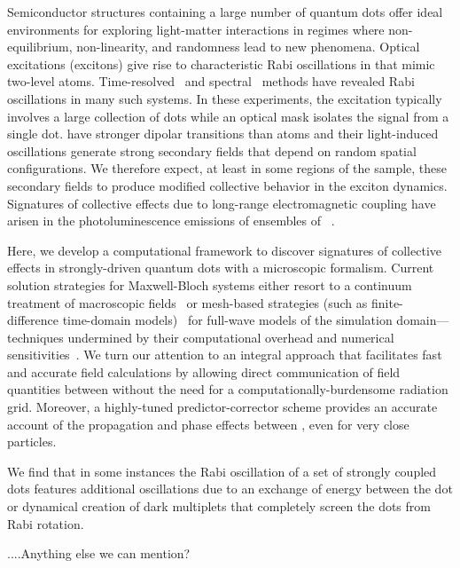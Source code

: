 Semiconductor structures containing a large number of quantum dots offer ideal environments for exploring light-matter interactions in regimes where non-equilibrium, non-linearity, and randomness lead to new phenomena.
Optical excitations (excitons) give rise to characteristic Rabi oscillations in \qds{} that mimic two-level atoms.
Time-resolved~\cite{stievater,shih} and spectral~\cite{kamada} methods have revealed Rabi oscillations in many such systems.
In these experiments, the excitation typically involves a large collection of dots while an optical mask isolates the signal from a single dot.
\Qds{} have stronger dipolar transitions than atoms and their light-induced oscillations generate strong secondary fields that depend on random spatial configurations.
We therefore expect, at least in some regions of the sample, these secondary fields to produce modified collective behavior in the exciton dynamics.
Signatures of collective effects due to long-range electromagnetic coupling have arisen in the photoluminescence emissions of ensembles of \qds{}~\cite{forchel}.

Here, we develop a computational framework to discover signatures of collective effects in strongly-driven quantum dots with a microscopic formalism.
Current solution strategies for Maxwell-Bloch systems either resort to a continuum treatment of macroscopic fields~\cite{} or mesh-based strategies (such as finite-difference time-domain models)~\cite{Vanneste2001, Fratalocchi2008} for full-wave models of the simulation domain---techniques undermined by their computational overhead and numerical sensitivities~\cite{Baczewski2013}.
We turn our attention to an integral approach that facilitates fast and accurate field calculations by allowing direct communication of field quantities between \qds{} without the need for a computationally-burdensome radiation grid.
Moreover, a highly-tuned predictor-corrector scheme provides an accurate account of the propagation and phase effects between \qds{}, even for very close particles.

We find that in some instances the Rabi oscillation of a set of strongly coupled dots features additional oscillations due to an exchange of energy between the dot or dynamical creation of dark multiplets that completely screen the dots from Rabi rotation.


....Anything else we can mention?
